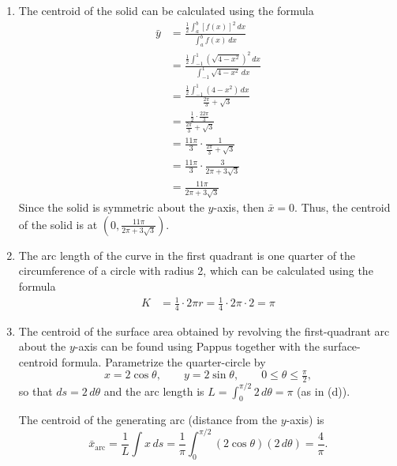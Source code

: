 \documentclass[10pt,openany,a4paper]{article}
\theoremstyle{definition}
\theoremstyle{definition}
\theoremstyle{plain}
\begin{document}
\begin{enumerate}
\begin{enumerate}
\begin{align*}
            &= \pi \left[ (4 - \frac{1}{3}) - (-4 + \frac{1}{3}) \right] \\
            &= \pi \left[ \frac{11}{3} + \frac{11}{3} \right] \\
            &= \frac{22\pi}{3}
        \end{align*}
        \item The centroid of the solid can be calculated using the formula
        \begin{align*}
            \bar{y} &= \frac{\frac{1}{2}\int_a^b [f(x)]^2 \, dx}{\int_a^b f(x) \, dx} \\
            &= \frac{\frac{1}{2}\int_{-1}^{1} (\sqrt{4-x^2})^2 \, dx}{\int_{-1}^{1} \sqrt{4-x^2} \, dx} \\
            &= \frac{\frac{1}{2}\int_{-1}^{1} (4-x^2) \, dx}{\frac{2\pi}{3} + \sqrt{3}} \\
            &= \frac{\frac{1}{2} \cdot \frac{22\pi}{3}}{\frac{2\pi}{3} + \sqrt{3}} \\
            &= \frac{11\pi}{3} \cdot \frac{1}{\frac{2\pi}{3} + \sqrt{3}} \\
            &= \frac{11\pi}{3} \cdot \frac{3}{2\pi + 3\sqrt{3}} \\
            &= \frac{11\pi}{2\pi + 3\sqrt{3}}
        \end{align*}
        Since the solid is symmetric about the $y$-axis, then $\bar{x}=0$. Thus, the centroid of the solid is at $\left(0, \frac{11\pi}{2\pi + 3\sqrt{3}}\right)$.
        \item The arc length of the curve in the first quadrant is one quarter of the circumference of a circle with radius 2, which can be calculated using the formula
        \begin{align*}
            K &= \frac{1}{4} \cdot 2\pi r = \frac{1}{4} \cdot 2\pi \cdot 2 = \pi
        \end{align*}
        \item The centroid of the surface area obtained by revolving the first-quadrant arc about the $y$-axis can be found using Pappus together with the surface-centroid formula. Parametrize the quarter-circle by
        \[ x=2\cos\theta,\qquad y=2\sin\theta,\qquad 0\leq\theta\leq\tfrac{\pi}{2},\]
        so that $ds=2\,d\theta$ and the arc length is $L=\int_0^{\pi/2}2\,d\theta=\pi$ (as in (d)).

        The centroid of the generating arc (distance from the $y$-axis) is
        \[ \bar{x}_{\text{arc}}=\frac{1}{L}\int x\,ds=\frac{1}{\pi}\int_0^{\pi/2}(2\cos\theta)(2\,d\theta)=\frac{4}{\pi}.\]


\end{enumerate}
\end{enumerate}
\end{document}
